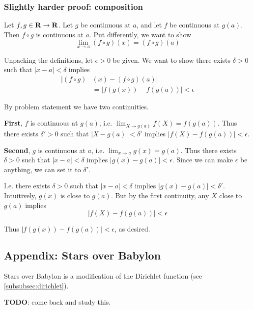 \subsubsection*{Slightly harder proof: composition}

Let $f,g\in\mathbf{R}\to\mathbf{R}$. Let $g$ be continuous at $a$, and let $f$ be
continuous at $g(a)$. Then $f\circ g$ is continuous at $a$. Put
differently, we want to show
\[\lim_{x\to a}(f\circ g)(x)=(f\circ g)(a)\]

Unpacking the definitions, let $\epsilon>0$ be given. We want to show there
exists $\delta>0$ such that $|x-a|<\delta$ implies
\begin{align*}
    |(f\circ g)&(x)-(f\circ g)(a)|\\
    &=|f(g(x))-f(g(a))|<\epsilon
\end{align*}

By problem statement we have two continuities.

\vs

\textbf{First}, $f$ is continuous at $g(a)$, i.e.
$\lim_{X\to g(a)}f(X)=f(g(a))$. Thus there exists $\delta'>0$ such that
$|X-g(a)|<\delta'$ implies $|f(X)-f(g(a))|<\epsilon$.

\vs

\textbf{Second}, $g$ is continuous at $a$, i.e.
$\lim_{x\to a}g(x)=g(a)$. Thus there exists $\delta>0$ such that
$|x-a|<\delta$ implies $|g(x)-g(a)|<\epsilon$. Since we can make
$\epsilon$ be anything, we can set it to $\delta'$.

\vs

I.e. there exists $\delta>0$ such that $|x-a|<\delta$ implies
$|g(x)-g(a)|<\delta'$. Intuitively, $g(x)$ is close to $g(a)$. But by the
first continuity, any $X$ close to $g(a)$ implies
\[|f(X)-f(g(a))|<\epsilon\]

Thus $|f(g(x))-f(g(a))|<\epsilon$, as desired.

\subsection{Appendix: Stars over Babylon}
Stars over Babylon is a modification of the Dirichlet function (see
\ref{subsubsec:dirichlet}).

\vs

\textbf{TODO}: come back and study this.

